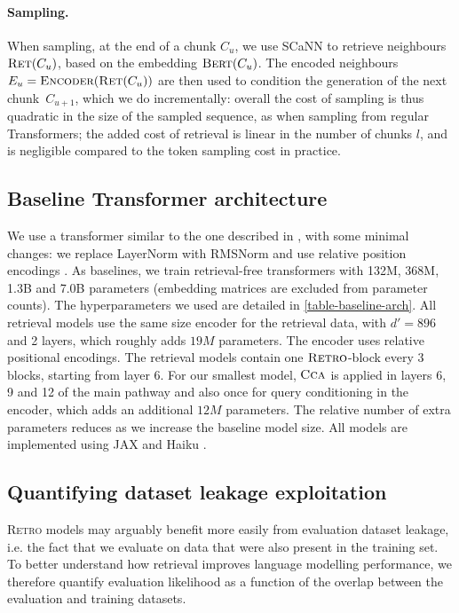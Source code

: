 \paragraph{Sampling.} When sampling, at the end of a chunk $C_u$, we use SCaNN to retrieve neighbours $\textsc{Ret}(C_u)$, based on the embedding $\textsc{Bert}(C_u)$. The encoded neighbours $E_u = \textsc{Encoder}(\textsc{Ret}(C_u))$ are then used to condition the generation of the next chunk~$C_{u+1}$, which we do incrementally: overall the cost of sampling is thus quadratic in the size of the sampled sequence, as when sampling from regular Transformers; the added cost of retrieval is linear in the number of chunks $l$, and is negligible compared to the token sampling cost in practice.

\subsection{Baseline Transformer architecture} We use a transformer \citep{vaswani2017attention} similar to the one described in \citep{radford2019language}, with some minimal changes: we replace LayerNorm with RMSNorm \citep{zhang2019root} and use relative position encodings \citep{dai2019transformer}. As baselines, we train retrieval-free transformers with 132M, 368M, 1.3B and 7.0B parameters (embedding matrices are excluded from parameter counts). The hyperparameters we used are detailed in \autoref{table-baseline-arch}. 
All retrieval models use the same size encoder for the retrieval data, with $d'=896$ and 2 layers, which roughly adds $19M$ parameters. The encoder uses relative positional encodings. The retrieval models contain one $\textsc{Retro}$-block every 3 blocks, starting from layer 6. For our smallest model, $\textsc{Cca}$  is applied in layers 6, 9 and 12 of the main pathway and also once for query conditioning in the encoder, which adds an additional  $12M$ parameters. The relative number of extra parameters reduces as we increase the baseline model size. All models are implemented using JAX \citep{jax2018github} and Haiku \citep{haiku2020github}. 

\subsection{Quantifying dataset leakage exploitation}\label{sec:leakage-quantification}

\textsc{Retro} models may arguably benefit more easily from evaluation dataset leakage, i.e. the fact that we evaluate on data that were also present in the training set. To better understand how retrieval improves language modelling performance, we therefore quantify evaluation likelihood as a function of the overlap between the evaluation and training datasets.

